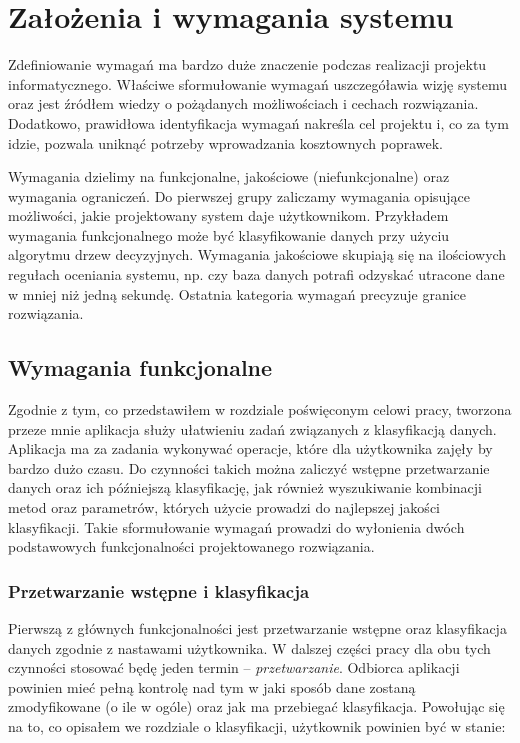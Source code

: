 \documentclass[../thesis.tex]{subfiles}
\begin{document}
\pagestyle{plain}

\chapter{Założenia i wymagania systemu}

Zdefiniowanie wymagań ma bardzo duże znaczenie podczas realizacji projektu informatycznego. Właściwe sformułowanie wymagań uszczegóławia wizję systemu oraz jest źródłem wiedzy o pożądanych możliwościach i cechach rozwiązania. Dodatkowo, prawidłowa identyfikacja wymagań nakreśla cel projektu i, co za tym idzie, pozwala uniknąć potrzeby wprowadzania kosztownych poprawek.

Wymagania dzielimy na funkcjonalne, jakościowe (niefunkcjonalne) oraz wymagania ograniczeń. Do pierwszej grupy zaliczamy wymagania opisujące możliwości, jakie projektowany system daje użytkownikom. Przykładem wymagania funkcjonalnego może być klasyfikowanie danych przy użyciu algorytmu drzew decyzyjnych. Wymagania jakościowe skupiają się na ilościowych regułach oceniania systemu, np. czy baza danych potrafi odzyskać utracone dane w mniej niż jedną sekundę. Ostatnia kategoria wymagań precyzuje granice rozwiązania.

\section{Wymagania funkcjonalne}

Zgodnie z tym, co przedstawiłem w rozdziale poświęconym celowi pracy, tworzona przeze mnie aplikacja służy ułatwieniu zadań związanych z klasyfikacją danych. Aplikacja ma za zadania wykonywać operacje, które dla użytkownika zajęły by bardzo dużo czasu. Do czynności takich można zaliczyć wstępne przetwarzanie danych oraz ich późniejszą klasyfikację, jak również wyszukiwanie kombinacji metod oraz parametrów, których użycie prowadzi do najlepszej jakości klasyfikacji. Takie sformułowanie wymagań prowadzi do wyłonienia dwóch podstawowych funkcjonalności projektowanego rozwiązania.

\subsection{Przetwarzanie wstępne i klasyfikacja}

Pierwszą z głównych funkcjonalności jest przetwarzanie wstępne oraz klasyfikacja danych zgodnie z nastawami użytkownika. W dalszej części pracy dla obu tych czynności stosować będę jeden termin -- \emph{przetwarzanie}. Odbiorca aplikacji powinien mieć pełną kontrolę nad tym w jaki sposób dane zostaną zmodyfikowane (o ile w ogóle) oraz jak ma przebiegać klasyfikacja. Powołując się na to, co opisałem we rozdziale o klasyfikacji, użytkownik powinien być w stanie:
\end{document}
